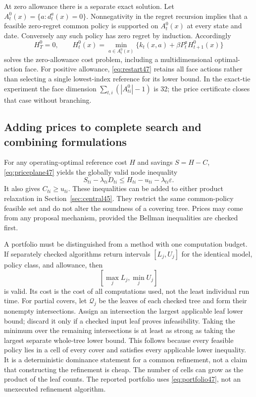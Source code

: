 At zero allowance there is a separate exact solution. Let
$A^0_t(x)=\{a:d_t^a(x)=0\}$. Nonnegativity in the regret recursion implies that a feasible zero-regret common policy is supported on $A^0_t(x)$ at every state and date. Conversely any such policy has zero regret by induction. Accordingly
\begin{equation}\label{eq:face47}
 H_T^0=0,\qquad H_t^0(x)=\min_{a\in A_t^0(x)}\{k_t(x,a)+\beta P_t^aH_{t+1}^0(x)\}
\end{equation}
solves the zero-allowance cost problem, including a multidimensional optimal-action face. For positive allowance, \eqref{eq:restart47} retains all face actions rather than selecting a single lowest-index reference for its lower bound. In the exact-tie experiment the face dimension $\sum_{t,i}(|A^0_{ti}|-1)$ is 32; the price certificate closes that case without branching.

\subsection{Adding prices to complete search and combining formulations}
For any operating-optimal reference cost $H$ and savings $S=H-C$, \eqref{eq:priceplane47} yields the globally valid node inequality
\begin{equation}\label{eq:pricecut47}
 S_{ti}-\lambda_{ti}D_{ti}\le H_{ti}-u_{ti}-\lambda_{ti}\varepsilon.
\end{equation}
It also gives $C_{ti}\ge u_{ti}$. These inequalities can be added to either product relaxation in Section~\ref{sec:central45}. They restrict the same common-policy feasible set and do not alter the soundness of a covering tree. Prices may come from any proposal mechanism, provided the Bellman inequalities are checked first.

A portfolio must be distinguished from a method with one computation budget. If separately checked algorithms return intervals $[L_j,U_j]$ for the identical model, policy class, and allowance, then
\begin{equation}\label{eq:portfolio47}
 [\max_j L_j,\min_j U_j]
\end{equation}
is valid. Its cost is the cost of all computations used, not the least individual run time. For partial covers, let $\mathcal Q_j$ be the leaves of each checked tree and form their nonempty intersections. Assign an intersection the largest applicable leaf lower bound; discard it only if a checked input leaf proves infeasibility. Taking the minimum over the remaining intersections is at least as strong as taking the largest separate whole-tree lower bound. This follows because every feasible policy lies in a cell of every cover and satisfies every applicable lower inequality. It is a deterministic dominance statement for a common refinement, not a claim that constructing the refinement is cheap. The number of cells can grow as the product of the leaf counts. The reported portfolio uses \eqref{eq:portfolio47}, not an unexecuted refinement algorithm.

